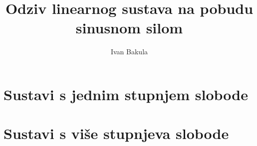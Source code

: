 \documentclass{rgn}
\author{Ivan Bakula}
\title{Odziv linearnog sustava na pobudu sinusnom silom}
\begin{document}
\maketitle

\begin{titlepage}
    
\end{titlepage}

\frontmatter
\tableofcontents
\newpage
\listoftables
\newpage
\listoffigures
\newpage

\mainmatter
\chapter{Sustavi s jednim stupnjem slobode}
    
    \newpage
    
    \newpage
    
    
    \newpage
    
    \newpage
    
    \newpage
    
    \newpage
    
    \newpage
    
    \newpage
    
    \newpage
    
    \newpage
\chapter{Sustavi s više stupnjeva slobode}
    
    \newpage
    
    \newpage
    
    \newpage
    
    \newpage
    
    \newpage
    

\printbibliography[title=Popis literature]
\end{document}

